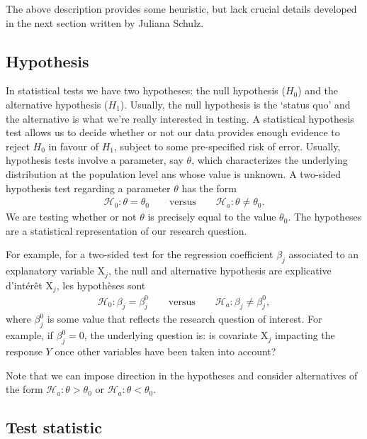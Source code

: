 \documentclass[
  11pt,
  letterpaper,
]{book}
\theoremstyle{definition}
\theoremstyle{definition}
\theoremstyle{definition}
\theoremstyle{remark}
\begin{document}
The above description provides some heuristic, but lack crucial details developed in the next section written by Juliana Schulz.

\hypertarget{hypothesis}{%
\subsection{Hypothesis}\label{hypothesis}}

In statistical tests we have two hypotheses: the null hypothesis (\(H_0\)) and the alternative hypothesis (\(H_1\)). Usually, the null hypothesis is the `status quo' and the alternative is what we're really interested in testing. A statistical hypothesis test allows us to decide whether or not our data provides enough evidence to reject \(H_0\) in favour of \(H_1\), subject to some pre-specified risk of error. Usually, hypothesis tests involve a parameter, say \(\theta\), which characterizes the underlying distribution at the population level ans whose value is unknown. A two-sided hypothesis test regarding a parameter \(\theta\) has the form
\begin{align*}
\mathscr{H}_0: \theta=\theta_0 \qquad \text{versus} \qquad \mathscr{H}_a:\theta \neq \theta_0.
\end{align*}
We are testing whether or not \(\theta\) is precisely equal to the value \(\theta_0\). The hypotheses are a statistical representation of our research question.

For example, for a two-sided test for the regression coefficient \(\beta_j\) associated to an explanatory variable \(\mathrm{X}_j\), the null and alternative hypothesis are
explicative d'intérêt \(\mathrm{X}_j\), les hypothèses sont
\begin{align*}
\mathscr{H}_0: \beta_j=\beta_j^0 \qquad \text{versus} \qquad \mathscr{H}_a:\beta_j \neq \beta_j^0, 
\end{align*}
where \(\beta_j^0\) is some value that reflects the research question of interest. For example, if \(\beta_j^0=0\), the underlying question is: is covariate \(\mathrm{X}_j\) impacting the response \(Y\) once other variables have been taken into account?

Note that we can impose direction in the hypotheses and consider alternatives of the form \(\mathscr{H}_a: \theta > \theta_0\) or \(\mathscr{H}_a: \theta < \theta_0\).

\hypertarget{test-statistic}{%
\subsection{Test statistic}\label{test-statistic}}
\end{document}
